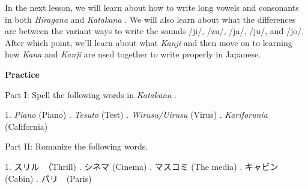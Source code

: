 \par{ In the next lesson, we will learn about how to write long vowels and consonants in both \emph{Hiragana }and \emph{Katakana }. We will also learn about what the differences are between the variant ways to write the sounds \slash ji\slash , \slash zu\slash , \slash ja\slash , \slash ju\slash , and \slash jo\slash . After which point, we'll learn about what \emph{Kanji }and then move on to learning how \emph{Kana }and \emph{Kanji }are used together to write properly in Japanese. }

\begin{center}
\textbf{Practice }
\end{center}

\par{Part I: Spell the following words in \emph{Katakana }. }

\par{1. \emph{Piano }\emph{ }(Piano)    \hfill{}. \emph{Tesuto }(Test)   \hfill{}. \emph{Wirusu\slash Uirusu }(Virus)  \hfill{}. \emph{Kariforunia }(California) }

\par{Part II: Romanize the following words. }

\par{1. スリル　（Thrill)  \hfill{}. シネマ (Cinema)  \hfill{}. マスコミ (The media) \hfill{}. キャビン　(Cabin)  \hfill{}. パリ　(Paris)  }
    
